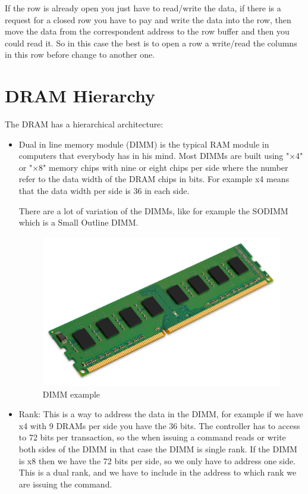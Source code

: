If the row is already open you just have to read/write the data, if there is a request for a closed row you have to pay and write the data into the row, then move the data from the correspondent address to the row buffer and then you could read it.
So in this case the best is to open a row a write/read the columns in this row before change to another one.

\section{DRAM Hierarchy}

The DRAM has a hierarchical architecture:
\begin{itemize}
    \item Dual in line memory module (DIMM) is the typical RAM module in computers that everybody has in his mind. Most DIMMs are built using "×4" or "×8" memory chips with nine or eight chips per side where the number refer to the data width of the DRAM chips in bits. For example x4 means that the data width per side is 36 in each side.  
    
    There are a lot of variation of the DIMMs, like for example the SODIMM which is a Small Outline DIMM.
    
    \begin{figure}
        \centering
        \includegraphics[scale=0.08]{img/ram.jpg}
        \caption{DIMM example}
        \label{fig:ram}
    \end{figure}
    
    \item Rank: This is a way to address the data in the DIMM, for example if we have x4 with 9 DRAMs per side you have the 36 bits. The controller has to access to 72 bits per transaction, so the when issuing a command reads or write both sides of the DIMM in that case the DIMM is single rank. If the DIMM is x8 then we have the 72 bits per side, so we only have to address one side. This is a dual rank, and we have to include in the address to which rank we are issuing the command.
    

\end{itemize}
